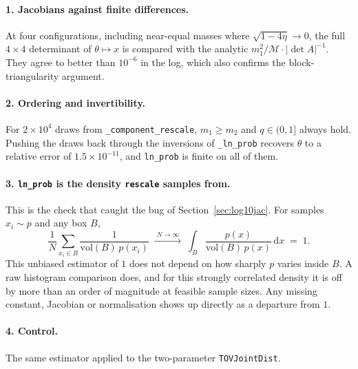 \documentclass[11pt,a4paper]{article}
\newcommand{\Mc}{\mathcal{M}}
\newcommand{\dd}{\mathrm{d}}
\newcommand{\code}[1]{\texttt{#1}}
\begin{document}
\paragraph{1. Jacobians against finite differences.}
At four configurations, including near-equal masses where
$\sqrt{1-4\eta} \to 0$, the full $4\times4$ determinant of $\theta \mapsto x$ is
compared with the analytic $m_1^2/\Mc \cdot \lvert\det A\rvert^{-1}$. They agree
to better than $10^{-6}$ in the log, which also confirms the block-triangularity
argument.

\paragraph{2. Ordering and invertibility.}
For $2\times10^4$ draws from \code{\_component\_rescale}, $m_1 \ge m_2$ and
$q \in (0, 1]$ always hold. Pushing the draws back through the inversions of
\code{\_ln\_prob} recovers $\theta$ to a relative error of $1.5\times10^{-11}$,
and \code{ln\_prob} is finite on all of them.

\paragraph{3. \code{ln\_prob} is the density \code{rescale} samples from.}
This is the check that caught the bug of Section~\ref{sec:log10jac}. For
samples $x_i \sim p$ and any box $B$,
\begin{equation}
  \frac{1}{N} \sum_{x_i \in B} \frac{1}{\mathrm{vol}(B)\, p(x_i)}
  \;\xrightarrow{\;N \to \infty\;}\;
  \int_B \frac{p(x)}{\mathrm{vol}(B)\, p(x)}\,\dd x \;=\; 1 .
\end{equation}
This unbiased estimator of $1$ does not depend on how sharply $p$ varies inside
$B$. A raw histogram comparison does, and for this strongly correlated density
it is off by more than an order of magnitude at feasible sample sizes. Any
missing constant, Jacobian or normalisation shows up directly as a departure
from $1$.

\paragraph{4. Control.}
The same estimator applied to the two-parameter \code{TOVJointDist}.
\end{document}
